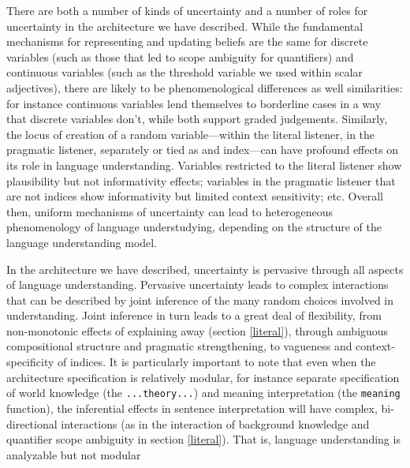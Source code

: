 \documentclass[12pt]{article}
\begin{document}
There are both a number of kinds of uncertainty and a number of roles for uncertainty in the architecture we have described.
While the fundamental mechanisms for representing and updating beliefs are the same for discrete variables (such as those that led to scope ambiguity for quantifiers) and continuous variables (such as the threshold variable we used within scalar adjectives), there are likely to be phenomenological differences as well similarities: for instance continuous variables lend themselves to borderline cases in a way that discrete variables don't, while both support graded judgements. Similarly, the locus of creation of a random variable---within the literal listener, in the pragmatic listener, separately or tied as and index---can have profound effects on its role in language understanding. Variables restricted to the literal listener show plausibility but not informativity effects; variables in the pragmatic listener that are not indices show informativity but limited context sensitivity; etc. Overall then, uniform mechanisms of uncertainty can lead to heterogeneous phenomenology of language understudying, depending on the structure of the language understanding model. 

In the architecture we have described, uncertainty is pervasive through all aspects of language understanding. Pervasive uncertainty leads to complex interactions that can be described by joint inference of the many random choices involved in understanding. Joint inference in turn leads to a great deal of flexibility, from non-monotonic effects of explaining away (section \ref{literal}), through ambiguous compositional structure and pragmatic strengthening, to vagueness and context-specificity of indices. It is particularly important to note that even when the architecture specification is relatively modular, for instance separate specification of world knowledge (the \lstinline{...theory...}) and meaning interpretation (the \lstinline{meaning} function), the inferential effects in sentence interpretation will have complex, bi-directional interactions (as in the interaction of background knowledge and quantifier scope ambiguity in section \ref{literal}). That is, language understanding is analyzable but not modular




\appendix
\end{document}
